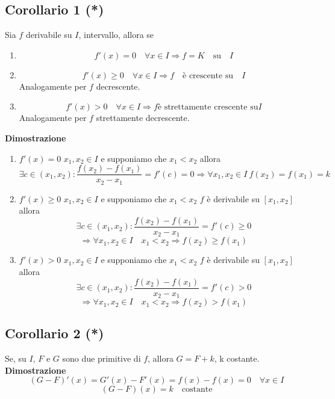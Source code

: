 \documentclass[12pt]{article}
\begin{document}
\subsection{Corollario 1 (*)}
Sia $f$ derivabile su $I$, intervallo,
allora se
\begin{enumerate}
  \item \[ f'(x) = 0 \quad \forall x \in I \Rightarrow f=K \quad \text{su} \quad I\]
  \item \[f'(x) \geq 0 \quad \forall x \in I \Rightarrow f \quad \text{è crescente su} \quad I\]
Analogamente per $f$ decrescente.
\item \[f'(x) > 0 \quad \forall x \in I
\Rightarrow f \text{è strettamente crescente su} I\]
Analogamente per $f$ strettamente decrescente.
\end{enumerate}
\textbf{Dimostrazione}
\begin{enumerate}
\item $f'(x)=0$\newline
$x_1, x_2 \in I$ e supponiamo che $x_1<x_2$ allora \[\exists c \in (x_1, x_2): \frac{f(x_2)-f(x_1)}{x_2-x_1} = f'(c) = 0
\Rightarrow \forall x_1, x_2 \in I\ f(x_2) = f(x_1) = k\]
\item $f'(x) \geq 0$\newline
$x_1, x_2 \in I$ e supponiamo che $x_1<x_2$\newline
$f$ è derivabile su $[x_1,x_2]$ allora
\[ \exists c \in (x_1, x_2): 
\frac{f(x_2)-f(x_1)}{x_2 - x_1} = f'(c) \geq 0 
\]
\[
\Rightarrow \forall x_1, x_2 \in I \quad x_1<x_2 \Rightarrow f(x_2) \geq f(x_1) 
\]

\item $f'(x) > 0$\newline
$x_1, x_2 \in I$ e supponiamo che $x_1<x_2$\newline
$f$ è derivabile su $[x_1,x_2]$ allora
\[ \exists c \in (x_1, x_2): 
\frac{f(x_2)-f(x_1)}{x_2 - x_1} = f'(c) > 0
\]
\[
\Rightarrow \forall x_1, x_2 \in I \quad x_1<x_2 \Rightarrow f(x_2) > f(x_1) 
\]
\end{enumerate}

\subsection{Corollario 2 (*)}
Se, su $I$, $F$ e $G$ sono due primitive di $f$, allora $G = F+k$, k costante.\newline
\textbf{Dimostrazione}
\[(G-F)'(x) = G'(x) - F'(x) = f(x) - f(x) = 0 \quad \forall x \in I\]
\[ (G-F)(x) = k \quad \text{costante}\]
\end{document}

